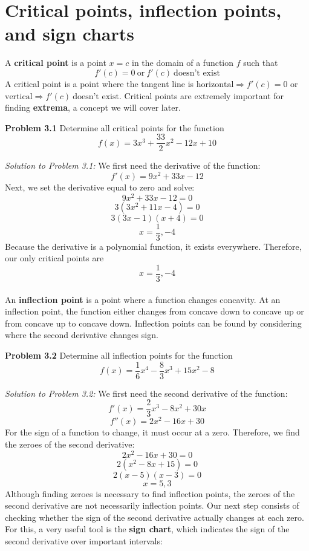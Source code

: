 \documentclass[11pt]{scrartcl}
\begin{document}
\section{Critical points, inflection points, and sign charts}
\noindent 
A \textbf{critical point} is a point $x=c$ in the domain of a function $f$ such that 
$$f'(c)=0 \ \text{or} \ f'(c) \ \text{doesn't exist}$$
\noindent 
A critical point is a point where the tangent line is $\text{horizontal} \Rightarrow f'(c)=0$ or $\text{vertical} \Rightarrow f'(c) \ \text{doesn't exist}$. Critical points are extremely important for finding \textbf{extrema}, a concept we will cover later. 
\begin{tcolorbox}
[colback=purple!5!white,colframe=purple!75!black]
\textbf{Problem 3.1} Determine all critical points for the function 
$$f(x)=3x^3+\frac{33}{2}x^2-12x+10$$
\end{tcolorbox}
\noindent 
\textit{Solution to Problem 3.1:} We first need the derivative of the function: 
$$f'(x)=9x^2+33x-12$$
\noindent 
Next, we set the derivative equal to zero and solve:
$$9x^2+33x-12=0$$
$$3(3x^2+11x-4)=0$$
$$3(3x-1)(x+4)=0$$
$$x=\frac{1}{3}, -4$$
\noindent 
Because the derivative is a polynomial function, it exists everywhere. Therefore, our only critical points are 
$$x=\frac{1}{3}, -4$$
\\
\noindent 
An \textbf{inflection point} is a point where a function changes concavity. At an inflection point, the function either changes from concave down to concave up or from concave up to concave down. Inflection points can be found by considering where the second derivative changes sign. 
\begin{tcolorbox}
[colback=purple!5!white,colframe=purple!75!black]
\textbf{Problem 3.2} Determine all inflection points for the function 
$$f(x)=\frac{1}{6}x^4-\frac{8}{3}x^3+15x^2-8$$
\end{tcolorbox}
\noindent 
\textit{Solution to Problem 3.2:} We first need the second derivative of the function: 
$$f'(x)=\frac{2}{3}x^3-8x^2+30x$$
$$f''(x)=2x^2-16x+30$$
\noindent 
For the sign of a function to change, it must occur at a zero. Therefore, we find the zeroes of the second derivative: 
$$2x^2-16x+30=0$$
$$2(x^2-8x+15)=0$$
$$2(x-5)(x-3)=0$$
$$x=5,3$$
\noindent 
Although finding zeroes is necessary to find inflection points, the zeroes of the second derivative are not necessarily inflection points. Our next step consists of checking whether the sign of the second derivative actually changes at each zero. For this, a very useful tool is the \textbf{sign chart}, which indicates the sign of the second derivative over important intervals: \\
\end{document}
